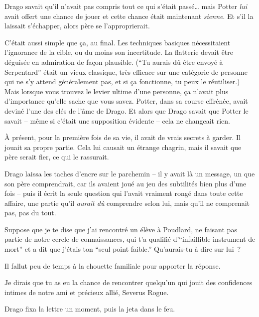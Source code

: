 Drago savait qu'il n'avait pas compris tout ce qui s'était passé… mais Potter \emph{lui} avait offert une chance de jouer et cette chance était maintenant \emph{sienne}.
Et s'il la laissait s'échapper, alors père se l'approprierait.

C'était aussi simple que ça, au final.
Les techniques basiques nécessitaient l'ignorance de la cible, ou du moins son incertitude.
La flatterie devait être déguisée en admiration de façon plausible.
(“Tu aurais dû être envoyé à Serpentard” était un vieux classique, très efficace sur une catégorie de personne qui ne s'y attend généralement pas, et si ça fonctionne, tu peux le réutiliser.)
Mais lorsque vous trouvez le levier ultime d'une personne, ça n'avait plus d'importance qu'elle sache que vous savez.
Potter, dans sa course effrénée, avait deviné l'une des clés de l'âme de Drago.
Et alors que Drago savait que Potter le savait -- même si c'était une supposition évidente -- cela ne changeait rien.

À présent, pour la première fois de sa vie, il avait de vrais secrets à garder.
Il jouait sa propre partie.
Cela lui causait un étrange chagrin, mais il savait que père serait fier, ce qui le rassurait.

Drago laissa les taches d'encre sur le parchemin -- il y avait là un message, un que son père comprendrait, car ils avaient joué au jeu des subtilités bien plus d'une fois -- puis il écrit la seule question qui l'avait vraiment rongé dans toute cette affaire, une partie qu'il \emph{aurait dû} comprendre selon lui, mais qu'il ne comprenait pas, pas du tout.

\begin{writtenNote}
Suppose que je te dise que j'ai rencontré un élève à Poudlard, ne faisant pas partie de notre cercle de connaissances, qui t'a qualifié d’“infaillible instrument de mort” et a dit que j'étais ton “seul point faible.”
Qu'aurais-tu à dire sur lui~?
\end{writtenNote}

Il fallut peu de temps à la chouette familiale pour apporter la réponse.

\begin{writtenNote}
Je dirais que tu as eu la chance de rencontrer quelqu'un qui jouit des confidences intimes de notre ami et précieux allié, Severus Rogue.
\end{writtenNote}

Drago fixa la lettre un moment, puis la jeta dans le feu.

